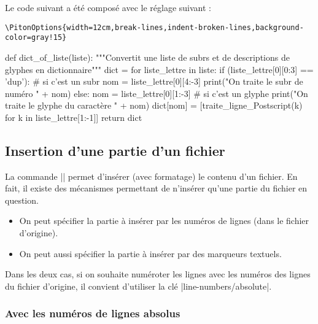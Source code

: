 \documentclass[dvipsnames,svgnames]{article}
\begin{document}
\bigskip
Le code suivant a été composé avec le réglage suivant :  

\begin{Verbatim}
\PitonOptions{width=12cm,break-lines,indent-broken-lines,background-color=gray!15}
\end{Verbatim}

\begin{center}
\begin{Piton}
def dict_of_liste(liste):
    """Convertit une liste de subrs et de descriptions de glyphes en dictionnaire"""
    dict = {}
    for liste_lettre in liste:
        if (liste_lettre[0][0:3] == 'dup'): # si c'est un subr
            nom = liste_lettre[0][4:-3]
            print("On traite le subr de numéro " + nom)
        else:
            nom = liste_lettre[0][1:-3] # si c'est un glyphe
            print("On traite le glyphe du caractère " + nom)
        dict[nom] = [traite_ligne_Postscript(k) for k in liste_lettre[1:-1]]
    return dict
\end{Piton}
\end{center}


\bigskip
\subsection{Insertion d'une partie d'un fichier}

\label{part-of-a-file}


La commande |\PitonInputFile| permet d'insérer (avec formatage) le contenu d'un fichier. En fait, il existe des
mécanismes permettant de n'insérer qu'une partie du fichier en question.
\begin{itemize}
\item On peut spécifier la partie à insérer par les numéros de lignes (dans le fichier d'origine).
\item On peut aussi spécifier la partie à insérer par des marqueurs textuels.
\end{itemize}
Dans les deux cas, si on souhaite numéroter les lignes avec les numéros des lignes du fichier d'origine, il
convient d'utiliser la clé |line-numbers/absolute|.

\subsubsection{Avec les numéros de lignes absolus}
\end{document}
